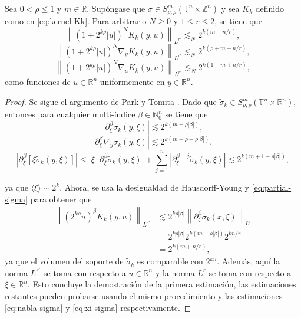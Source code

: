 \begin{lemma}
	Sea $0 < \rho \leq 1$ y $m\in \mathbb{R}$. Supóngase que $\sigma \in S^m_{\rho,\rho}(\mathbb{T}^n \times \mathbb{Z}^n) $ y sea $K_k$ definido como en \cref{eq:kernel-Kk}. Para arbitrario $N\geq 0$ y $1\leq r\leq 2$, se tiene que 
	\begin{equation*}
		\left\| (1+2^{k\rho}|u|)^N K_k(y, u)
		\right\|_{L^{r'}} \lesssim_N 2^{k(m+n/r)},
	\end{equation*}
	\begin{equation*}
		\left\| (1+2^{k\rho}|u|)^N \nabla_y K_k(y, u)
		\right\|_{L^{r'}} \lesssim_N 2^{k(\rho+m+n/r)},
	\end{equation*}
	\begin{equation*}
		\left\| (1+2^{k\rho}|u|)^N \nabla_u K_k(y, u)
		\right\|_{L^{r'}} \lesssim_N 2^{k(1+m+n/r)},
	\end{equation*}
	como funciones de $u\in\mathbb{R}^n$ uniformemente en $y\in\mathbb{R}^n$.
	\label{lem:kernel-estimates}
\end{lemma}
\begin{proof}
	Se sigue el argumento de Park y Tomita \cite{park-tomita}. Dado que $\tilde{\sigma}_k \in S^m_{\rho,\rho}(\mathbb{T}^n \times \mathbb{R}^n) $, entonces para cualquier multi-índice $\beta\in \mathbb{N}_0^n$ se tiene que
	\begin{equation}
		\left|\partial_\xi^\beta \tilde{\sigma}_k(y, \xi)\right| \lesssim 2^{k(m-\rho|\beta|)},
		\label{eq:partial-sigma}
	\end{equation}
	\begin{equation}
		\left|\partial_\xi^\beta \nabla_y \tilde{\sigma}_k(y, \xi)\right| \lesssim 2^{k(m+\rho-\rho|\beta|)},
		\label{eq:nabla-sigma}
	\end{equation}
	\begin{equation}
		\left|\partial_\xi^\beta [\xi  \tilde{\sigma}_k(y, \xi)]\right| \leq 
		\left|\xi\cdot\partial_\xi^\beta \tilde{\sigma}_k(y,\xi)\right| + \sum_{j=1}^n \left| \partial_\xi^{\beta-j} \tilde{\sigma}_k(y,\xi) \right|
		\lesssim
		2^{k(m+1-\rho|\beta|)},
		\label{eq:xi-sigma}
	\end{equation}
	
	ya que $\langle\xi\rangle \sim 2^k$. Ahora, se usa la desigualdad de Hausdorff-Young y \cref{eq:partial-sigma} para obtener que
	\begin{align*}
		\left\| (2^{k\rho}u)^\beta K_k(y, u)
		\right\|_{L^{r'}} & \lesssim2^{k\rho|\beta|} \left\| 
		\partial_\xi^\beta \tilde{\sigma}_k(x, \xi)
		\right\|_{L^{r}} \\
		& = 2^{k\rho|\beta|} 2^{k(m-\rho|\beta|)} 2^{kn/r} \\
		& =  2^{k(m+n/r)},
	\end{align*}
	ya que el volumen del soporte de $\tilde{\sigma}_k$ es comparable con $2^{kn}$. Además, aquí la norma $L^{r'}$ se toma con respecto a $u \in \mathbb{R}^n$ y la norma $L^{r}$ se toma con respecto a $\xi\in\mathbb{R}^n$. Esto concluye la demostración de la primera estimación, las estimaciones restantes pueden probarse usando el mismo procedimiento y las estimaciones \cref{eq:nabla-sigma} y \cref{eq:xi-sigma} respectivamente.
\end{proof}
